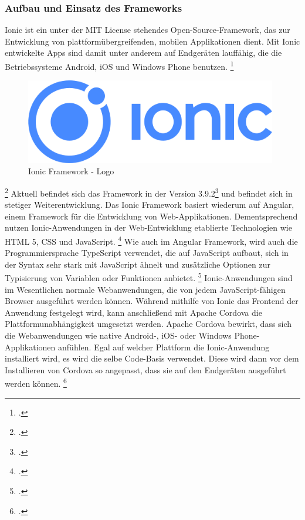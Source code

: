 \subsubsection{Aufbau und Einsatz des Frameworks}
Ionic ist ein unter der MIT License stehendes Open-Source-Framework, das zur Entwicklung von plattformübergreifenden, mobilen Applikationen dient. Mit Ionic entwickelte Apps sind damit unter anderem auf Endgeräten lauffähig, die die Betriebssysteme Android, iOS und Windows Phone benutzen. \footcite{Ion18a}
\begin{figure}[h]
	\centering
	\includegraphics[width=11cm]{Bilder/ionic.png}
	\caption[Ionic Framework - Logo]{Ionic Framework - Logo\footnotemark}
\end{figure}%
\footcitetext{Wik18}
\newline
Aktuell befindet sich das Framework in der Version 3.9.2\footcite[Vgl. ][]{Ion18b} und befindet sich in stetiger Weiterentwicklung. Das Ionic Framework basiert wiederum auf Angular, einem Framework für die Entwicklung von Web-Applikationen. Dementsprechend nutzen Ionic-Anwendungen in der Web-Entwicklung etablierte Technologien wie HTML 5, CSS und JavaScript. \footcite[Vgl. ][]{Ion18c} Wie auch im Angular Framework, wird auch die Programmiersprache TypeScript verwendet, die auf JavaScript aufbaut, sich in der Syntax sehr stark mit JavaScript ähnelt und zusätzliche Optionen zur Typisierung von Variablen oder Funktionen anbietet. \footcite[Vgl. ][]{Til17} \newline
Ionic-Anwendungen sind im Wesentlichen normale Webanwendungen, die von jedem JavaScript-fähigen Browser ausgeführt werden können. Während mithilfe von Ionic das Frontend der Anwendung festgelegt wird, kann anschließend mit Apache Cordova die Plattformunabhängigkeit umgesetzt werden. Apache Cordova bewirkt, dass sich die Webanwendungen wie native Android-, iOS- oder Windows Phone-Applikationen anfühlen. Egal auf welcher Plattform die Ionic-Anwendung installiert wird, es wird die selbe Code-Basis verwendet. Diese wird dann vor dem Installieren von Cordova so angepasst, dass sie auf den Endgeräten ausgeführt werden können. \footcite{Ion18d}
